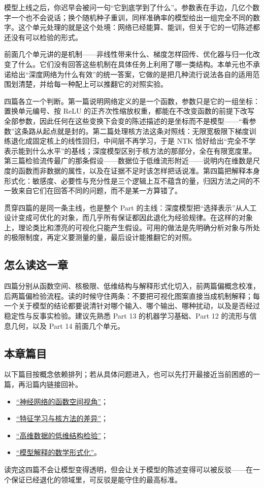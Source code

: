 模型上线之后，你迟早会被问一句``它到底学到了什么''。参数表在手边，几亿个数字一个也不会说话；换个随机种子重训，同样准确率的模型给出一组完全不同的数字。这个单元处理的就是这个处境：网络已经能算、能训，但关于它的一切陈述都还没有可以检验的形式。

前面几个单元讲的是机制——非线性带来什么、梯度怎样回传、优化器与归一化改变了什么。它们没有回答这些机制在具体任务上利用了哪一类结构。本单元也不承诺给出``深度网络为什么有效''的统一答案，它做的是把几种流行说法各自的适用范围划清楚，并给每一种配上可以推翻它的对照实验。

四篇各立一个判断。第一篇说明网络定义的是一个函数，参数只是它的一组坐标：置换单元编号、按 ReLU 的正齐次性缩放权重，都能在不改变函数的前提下改写全部参数，因此任何在这些变换下会变的陈述描述的是坐标而不是模型——``看参数''这条路从起点就是封的。第二篇处理核方法这条对照线：无限宽极限下梯度训练退化成固定核上的线性回归，中间层不再学习，于是 NTK 恰好给出``完全不学表示能到什么水平''的基线；深度模型区别于核方法的那部分，全在有限宽度里。第三篇检验流传最广的那条假设——数据位于低维流形附近——说明内在维数是尺度的函数而非数据的属性，以及在证据不足时该怎样把话说准。第四篇把解释本身形式化：敏感度、必要性与充分性是三个逻辑上互不蕴含的量，归因方法之间的不一致来自它们在回答不同的问题，而不是某一方算错了。

贯穿四篇的是同一条主线，也是整个 Part 的主线：深度模型把``选择表示''从人工设计变成可优化的对象，而几乎所有保证都因此退化为经验规律。在这样的对象上，理论类比和漂亮的可视化只能产生假设。可用的做法是先明确分析对象与所处的极限制度，再定义要测量的量，最后设计能推翻它的对照。

\subsection{怎么读这一章}

四篇分别从函数空间、核极限、低维结构与解释形式化切入，前两篇偏概念校准，后两篇偏检验流程。读的时候守住两条：不要把可视化图案直接当成机制解释；每一个关于模型的结论都要说清针对哪个输入、哪个输出、哪种扰动，以及是否经过稳定性与反事实检验。建议先熟悉 Part 13 的机器学习基础、Part 12 的流形与信息几何，以及 Part 14 前面几个单元。

\subsection{本章篇目}

以下篇目按概念依赖排列；若从具体问题进入，也可以先打开最接近当前困惑的一篇，再沿篇内链接回补。

\begin{itemize}
\tightlist
\item \hyperref[sec:14-Deep-Learning/10-Interpretability-Mathematics/01]{``神经网络的函数空间视角''}；
\item \hyperref[sec:14-Deep-Learning/10-Interpretability-Mathematics/02]{``特征学习与核方法的差异''}；
\item \hyperref[sec:14-Deep-Learning/10-Interpretability-Mathematics/03]{``高维数据的低维结构检验''}；
\item \hyperref[sec:14-Deep-Learning/10-Interpretability-Mathematics/04]{``模型解释的数学形式化''}。
\end{itemize}

读完这四篇不会让模型变得透明，但会让关于模型的陈述变得可以被反驳——在一个保证已经退化的领域里，可反驳是能守住的最高标准。
